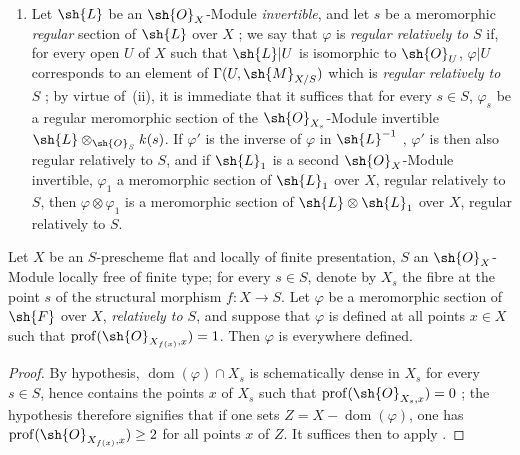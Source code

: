 \begin{remarks}[20.6.5]
\begin{enumerate}[label=(\roman*)]
  \item Let $\sh{L}$ be an $\sh{O}_X$-Module \emph{invertible}, and let $s$ be a meromorphic \emph{regular} section of $\sh{L}$ over $X$ ;
  we say that $\varphi$ is \emph{regular relatively to $S$} if, for every open $U$ of $X$ such that $\sh{L}|U$ is isomorphic to $\sh{O}_U$, $\varphi|U$ corresponds to an element of $\Gamma(U,\sh{M}_{X/S})$ which is \emph{regular relatively to $S$} ;
  by virtue of~(ii), it is immediate that it suffices that for every $s\in S$, $\varphi_s$ be a regular meromorphic section  of the $\sh{O}_{X_s}$-Module invertible $\sh{L}\otimes_{\sh{O}_S}k(s)$.
  If $\varphi'$ is the inverse of $\varphi$ in $\sh{L}^{-1}$ , $\varphi'$ is then also regular relatively to $S$, and if $\sh{L}_1$ is a second $\sh{O}_X$-Module invertible, $\varphi_1$ a meromorphic section of $\sh{L}_1$ over $X$, regular relatively to $S$, then $\varphi\otimes\varphi_1$ is a meromorphic section of $\sh{L}\otimes\sh{L}_1$ over $X$, regular relatively to $S$.
\end{enumerate}
\end{remarks}

\begin{proposition}[20.6.6]
\label{IV.20.6.6}
Let $X$ be an $S$-prescheme flat and locally of finite presentation, $S$ an $\sh{O}_X$-Module locally free of finite type;
for every $s\in S$, denote by $X_s$ the fibre at the point $s$ of the structural morphism $f:X\to S$.
Let $\varphi$ be a meromorphic section of $\sh{F}$ over $X$, \emph{relatively to $S$}, and suppose that $\varphi$ is defined at all points $x\in X$ such that $\operatorname{prof}(\sh{O}_{X_{f(x)},x})=1$.
Then $\varphi$ is everywhere defined.
\end{proposition}

\begin{proof}
By hypothesis, $\operatorname{dom}(\varphi)\cap X_s$ is schematically dense in $X_s$ for every $s\in S$, hence contains the points $x$ of $X_s$ such that $\operatorname{prof}(\sh{O}_{X_s,x})=0$ ;
the hypothesis therefore signifies that if one sets $Z=X-\operatorname{dom}(\varphi)$, one has $\operatorname{prof}(\sh{O}_{X_{f(x)},x})\geq 2$ for all points $x$ of $Z$.
It suffices then to apply .
\end{proof}

